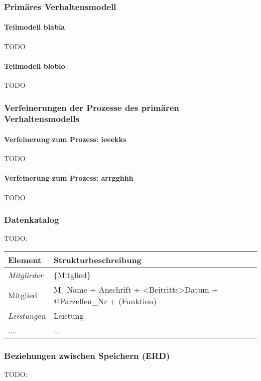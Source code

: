\subsubsection{Primäres Verhaltensmodell}
\paragraph{Teilmodell blabla}
TODO

\paragraph{Teilmodell bloblo}
TODO

\subsubsection{Verfeinerungen der Prozesse des primären Verhaltensmodells}
\paragraph{Verfeinerung zum Prozess: ieeekks}
TODO

\paragraph{Verfeinerung zum Prozess: arrgghhh}
TODO

\subsubsection{Datenkatalog}
TODO:
\begin{tabular}[ht]{|l|l|}
\hline
Element & Strukturbeschreibung \\
\hline\hline
\emph{Mitglieder} & \{Mitglied\} \\
Mitglied  & M\_Name + Anschrift + <Beitritts>Datum + @Parzellen\_Nr + (Funktion) \\
\hline\hline
\emph{Leistungen} & {Leistung} \\
.... & ... \\
\hline
\end{tabular}

\subsubsection{Beziehungen zwischen Speichern (ERD)}
TODO:

